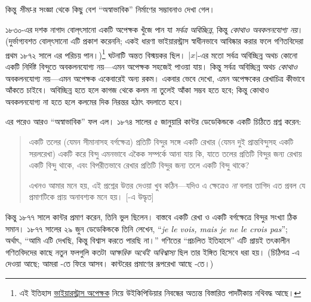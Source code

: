 \documentclass[../../../include/open-logic-section]{subfiles}
\begin{document}

কিন্তু \emph{সীমা}-র সংজ্ঞা থেকে
কিছু বেশ “অস্বাভাবিক” নির্মাণের
সম্ভাবনাও দেখা গেল।

১৮৩০-এর দশক নাগাদ বোল্‌ৎসানো
একটি অপেক্ষক খুঁজে পান যা
\emph{সর্বত্র অবিচ্ছিন্ন}, কিন্তু
\emph{কোথাও অবকলনযোগ্য নয়}।
(দুর্ভাগ্যবশত বোল্‌ৎসানো
এটি প্রকাশ করেননি; একই ধারণা
ভাইয়ারস্ট্রাস স্বাধীনভাবে আবিষ্কার
করার ফলে গণিতবিদেরা প্রথম
১৮৭২ সালে এর পরিচয় পান।)\footnote{এই
ইতিহাস \href{http://en.wikipedia.org/wiki/Weierstrass_function}{ভাইয়ারস্ট্রাস
অপেক্ষক} নিয়ে উইকিপিডিয়ার
নিবন্ধের অত্যন্ত বিস্তারিত
পাদটীকায় নথিবদ্ধ আছে।}
ঘটনাটি অন্তত বিস্ময়কর ছিল।
$|x|$-এর মতো সর্বত্র
অবিচ্ছিন্ন অথচ কোনো
একটি নির্দিষ্ট বিন্দুতে
অবকলনযোগ্য নয়—এমন
অপেক্ষক সহজেই পাওয়া যায়।
কিন্তু সর্বত্র অবিচ্ছিন্ন
অথচ \emph{কোথাও}
অবকলনযোগ্য নয়—এমন
অপেক্ষক একেবারেই
অন্য রকম। একবার
ভেবে দেখো, এমন
অপেক্ষকের রেখাচিত্র
কীভাবে আঁকতে
চাইবে। অবিচ্ছিন্ন
হতে হলে কাগজ
থেকে কলম না তুলেই
আঁকা সম্ভব হতে
হবে; কিন্তু কোথাও
অবকলনযোগ্য না
হতে হলে কলমের
দিক নিরন্তর
হঠাৎ বদলাতে হবে।

এর পরেও আরও
“অস্বাভাবিক” ফল
এল। ১৮৭৪ সালের
৫ জানুয়ারি কান্টর
ডেডেকিন্ডকে একটি
চিঠিতে প্রশ্ন
করেন:
\begin{quote}
একটি তলের (যেমন
সীমানাসহ বর্গক্ষেত্র)
প্রতিটি বিন্দুর সঙ্গে
একটি রেখার (যেমন
দুই প্রান্তবিন্দুসহ
একটি সরলরেখা)
একটি করে বিন্দু
এমনভাবে একৈক
সম্পর্কে আনা
যায় কি, যাতে
তলের প্রতিটি
বিন্দুর জন্য
রেখায় একটি
বিন্দু থাকে,
এবং বিপরীতভাবে
রেখার প্রতিটি
বিন্দুর জন্য
তলে একটি
বিন্দু থাকে?

এখনও আমার মনে
হয়, এই প্রশ্নের
উত্তর দেওয়া
খুব কঠিন—যদিও
এ ক্ষেত্রেও
\emph{না} বলার
তাগিদ এত
প্রবল যে
প্রমাণটিকে
প্রায় অনাবশ্যক
মনে হয়।
[\citealt{Gouvea2011}-এ
উদ্ধৃত]
\end{quote}
কিন্তু ১৮৭৭ সালে
কান্টর প্রমাণ
করেন, তিনি
ভুল ছিলেন।
বাস্তবে একটি
রেখা ও একটি
বর্গক্ষেত্রে
বিন্দুর সংখ্যা
ঠিক সমান।
১৮৭৭ সালের
২৯ জুন
ডেডেকিন্ডকে
তিনি লেখেন,
“\emph{je le vois,
mais je ne le
crois pas}”;
অর্থাৎ, “আমি
এটি দেখছি,
কিন্তু বিশ্বাস
করতে পারছি
না।” গণিতের
“প্রচলিত ইতিহাসে”
এটি প্রায়ই
তৎকালীন
গণিতবিদদের
কাছে নতুন
ফলগুলি কতটা
\emph{আক্ষরিক
অর্থেই অবিশ্বাস্য}
ছিল তার
ইঙ্গিত
হিসেবে ধরা
হয়। (চিঠিপত্র
\citet{Gouvea2011}-এ
দেওয়া আছে;
আমরা
-তে
ফিরে আসব।
কান্টরের
প্রমাণের
রূপরেখা আছে
-তে।)
\end{document}
